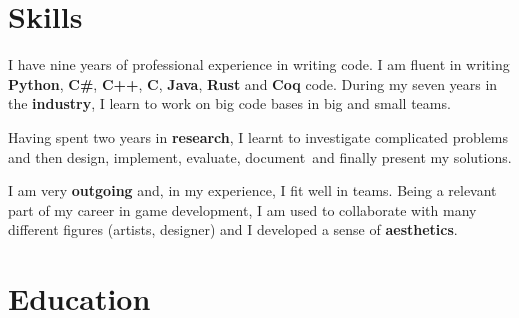 \documentclass[letterpaper]{twentysecondcv} %
\begin{document}

\makeprofile %


\section{Skills}

I have nine years of professional experience in writing code. I am fluent in writing \textbf{Python}, \textbf{C\#}, \textbf{C++}, \textbf{C}, \textbf{Java}, \textbf{Rust} and \textbf{Coq} code. During my seven years in the \textbf{industry}, I learn to work on big code bases in big and small teams. 

Having spent two years in \textbf{research}, I learnt to investigate complicated problems and then design, implement, evaluate, document and finally present my solutions.

I am very \textbf{outgoing} and, in my experience, I fit well in teams. Being a relevant part of my career in game development, I am used to collaborate with many different figures (artists, designer) and I developed a sense of \textbf{aesthetics}.






\section{Education}

\begin{twenty} %
\end{twenty}
\end{document}
